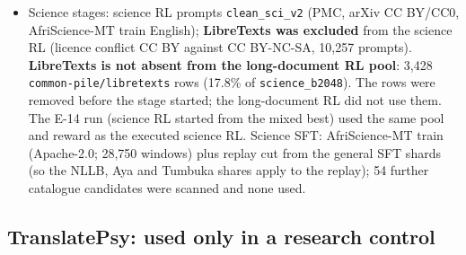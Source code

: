 \begin{itemize}
\item Science stages: science RL prompts \texttt{clean\_\allowbreak{}sci\_\allowbreak{}v2} (PMC, arXiv CC BY/CC0, AfriScience-MT train English); \textbf{LibreTexts was excluded} from the science RL (licence conflict CC BY against CC BY-NC-SA, 10,257 prompts). \textbf{LibreTexts is not absent from the long-document RL pool}: 3,428 \texttt{common-\allowbreak{}pile/\allowbreak{}libretexts} rows (17.8\% of \texttt{science\_\allowbreak{}b2048}). The rows were removed before the stage started; the long-document RL did not use them. The E-14 run (science RL started from the mixed best) used the same pool and reward as the executed science RL. Science SFT: AfriScience-MT train (Apache-2.0; 28,750 windows) plus replay cut from the general SFT shards (so the NLLB, Aya and Tumbuka shares apply to the replay); 54 further catalogue candidates were scanned and none used.
\end{itemize}

\subsection{TranslatePsy: used only in a research control}


